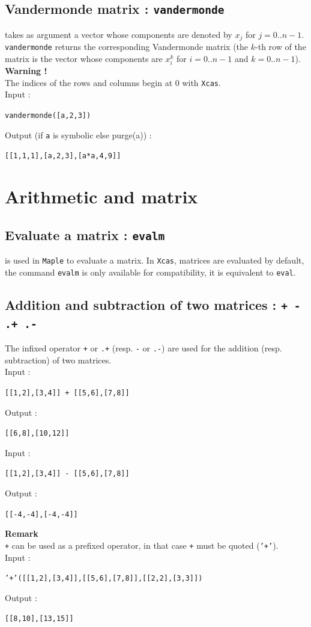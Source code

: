 \documentclass[a4paper,11pt]{book}
\begin{document}
\subsection{Vandermonde matrix : {\tt vandermonde}}
 takes as argument a vector  whose  components are
denoted by $x_j$ for $j=0..n-1$.\\
{\tt vandermonde} returns the corresponding Vandermonde matrix
(the $k$-th row of the matrix is the vector whose components are
$x_i^{k}$ for $i=0..n-1$ and $k=0..n-1$).\\
{\bf Warning !}\\ 
The indices of the rows and columns begin at 0 with {\tt Xcas}.\\
Input :
\begin{center}{\tt vandermonde([a,2,3])}\end{center}
Output (if {\tt a} is symbolic else purge(a)) :
\begin{center}{\tt  [[1,1,1],[a,2,3],[a*a,4,9]]}\end{center}

\section{Arithmetic and matrix}
\subsection{Evaluate a matrix : {\tt evalm}}
 is used in {\tt Maple} to evaluate a matrix.  
In {\tt Xcas}, matrices are evaluated by default, the command 
{\tt evalm} is only available for compatibility, it is equivalent
to {\tt eval}.

\subsection{Addition and subtraction of two matrices : {\tt + - .+ .-}}\index{+}\index{-}  
\noindent The infixed operator {\tt +} or {\tt .+} (resp. {\tt -} or {\tt .-})
are used for the  addition (resp. subtraction) of two matrices.\\
Input :
\begin{center}{\tt [[1,2],[3,4]] + [[5,6],[7,8]]}\end{center}
Output :
\begin{center}{\tt [[6,8],[10,12]]}\end{center}
Input :
\begin{center}{\tt [[1,2],[3,4]] - [[5,6],[7,8]]}\end{center}
Output :
\begin{center}{\tt [[-4,-4],[-4,-4]]}\end{center}
{\bf Remark}\\
{\tt +} can be used as a prefixed operator, in that case 
{\tt +} must be quoted ({\tt '+'}).\\
Input :
\begin{center}{\tt '+'([[1,2],[3,4]],[[5,6],[7,8]],[[2,2],[3,3]])}\end{center}
Output :
\begin{center}{\tt [[8,10],[13,15]]}\end{center}
\end{document}
